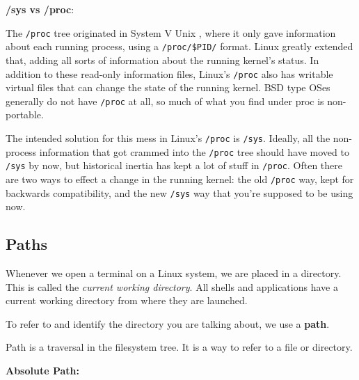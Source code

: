 \textbf{/sys vs /proc}:

The \lstinline|/proc| tree originated in System V Unix
, where it only gave information about each running process, using a
\lstinline|/proc/$PID/| format. Linux greatly extended that, adding all sorts of information about the running kernel's status. In addition to these read-only information files, Linux's \lstinline|/proc| also has writable virtual files that can change the state of the running kernel.
BSD
type OSes generally do not have \lstinline|/proc| at all, so much of what you find under proc is non-portable.

The intended solution for this mess in Linux's \lstinline|/proc| is \lstinline|/sys|. Ideally, all the non-process information that got crammed into the \lstinline|/proc| tree should have moved to \lstinline|/sys| by now, but historical inertia has kept a lot of stuff in \lstinline|/proc|.
Often there are two ways to effect a change in the running kernel: the old \lstinline|/proc| way, kept for backwards compatibility, and the new \lstinline|/sys| way that you're supposed to be using now.

\subsection{Paths}

Whenever we open a terminal on a Linux system, we are placed in a directory.
This is called the \textit{current working directory}.
All shells and applications have a current working directory from where they are launched.

To refer to and identify the directory you are talking about, we use a \textbf{path}.

\begin{definition}[Path]
  Path is a traversal in the filesystem tree.
  It is a way to refer to a file or directory.
\end{definition}

\textbf{Absolute Path:}

